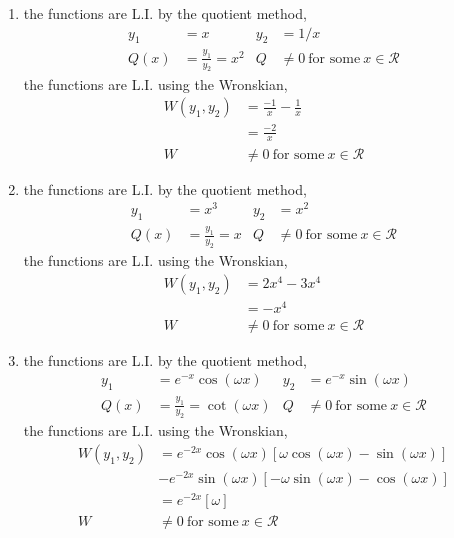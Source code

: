 \begin{enumerate}
    \item the functions are L.I. by the quotient method,
          \begin{align}
              y_{1} & = x                           & y_{2} & = 1/x                                      \\
              Q(x)  & = \frac{y_{1}}{y_{2}} = x^{2} & Q     & \neq 0\ \text{for some}\ x \in \mathcal{R}
          \end{align}
          the functions are L.I. using the Wronskian,
          \begin{align}
              W(y_{1}, y_{2}) & = \frac{-1}{x} - \frac{1}{x}               \\
                              & =\frac{-2}{x}                              \\
              W               & \neq 0\ \text{for some}\ x \in \mathcal{R}
          \end{align}

    \item the functions are L.I. by the quotient method,
          \begin{align}
              y_{1} & = x^{3}                   & y_{2} & = x^{2}                                    \\
              Q(x)  & = \frac{y_{1}}{y_{2}} = x & Q     & \neq 0\ \text{for some}\ x \in \mathcal{R}
          \end{align}
          the functions are L.I. using the Wronskian,
          \begin{align}
              W(y_{1}, y_{2}) & = 2x^{4} - 3x^{4}                          \\
                              & = -x^{4}                                   \\
              W               & \neq 0\ \text{for some}\ x \in \mathcal{R}
          \end{align}

    \item the functions are L.I. by the quotient method,
          \begin{align}
              y_{1} & = e^{-x}\cos(\omega x)                 & y_{2} & = e^{-x}\sin(\omega x)                     \\
              Q(x)  & = \frac{y_{1}}{y_{2}} = \cot(\omega x) & Q     & \neq 0\ \text{for some}\ x \in \mathcal{R}
          \end{align}
          the functions are L.I. using the Wronskian,
          \begin{align}
              W(y_{1}, y_{2}) & = e^{-2x}\cos(\omega x)[\omega \cos(\omega x) - \sin(\omega x)]  \\
                              & - e^{-2x}\sin(\omega x)[-\omega \sin(\omega x) - \cos(\omega x)] \\
                              & =e^{-2x}[\omega]                                                 \\
              W               & \neq 0\ \text{for some}\ x \in \mathcal{R}
          \end{align}


\end{enumerate}
